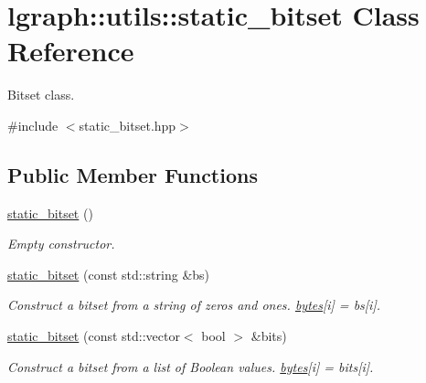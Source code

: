 \hypertarget{classlgraph_1_1utils_1_1static__bitset}{}\section{lgraph\+:\+:utils\+:\+:static\+\_\+bitset Class Reference}
\label{classlgraph_1_1utils_1_1static__bitset}


Bitset class.  




{\ttfamily \#include $<$static\+\_\+bitset.\+hpp$>$}

\subsection*{Public Member Functions}
\begin{DoxyCompactItemize}
\item 
\mbox{\label{classlgraph_1_1utils_1_1static__bitset_a6bd7edf22c70684b97eed197bb8fcda5}} 
\hyperlink{classlgraph_1_1utils_1_1static__bitset_a6bd7edf22c70684b97eed197bb8fcda5}{static\+\_\+bitset} ()
\begin{DoxyCompactList}\small\item\em Empty constructor. \end{DoxyCompactList}\item 
\mbox{\label{classlgraph_1_1utils_1_1static__bitset_ad8aaa938472eb7fcdc3ac1b3270600f6}} 
\hyperlink{classlgraph_1_1utils_1_1static__bitset_ad8aaa938472eb7fcdc3ac1b3270600f6}{static\+\_\+bitset} (const std\+::string \&bs)
\begin{DoxyCompactList}\small\item\em Construct a bitset from a string of zeros and ones. \hyperlink{classlgraph_1_1utils_1_1static__bitset_a56d277fc22bbf71a27fca530a133c9bd}{bytes}\mbox{[}i\mbox{]} = {\itshape bs}\mbox{[}i\mbox{]}. \end{DoxyCompactList}\item 
\mbox{\label{classlgraph_1_1utils_1_1static__bitset_a98921bd3c2ef416c5270045c63eb84a1}} 
\hyperlink{classlgraph_1_1utils_1_1static__bitset_a98921bd3c2ef416c5270045c63eb84a1}{static\+\_\+bitset} (const std\+::vector$<$ bool $>$ \&bits)
\begin{DoxyCompactList}\small\item\em Construct a bitset from a list of Boolean values. \hyperlink{classlgraph_1_1utils_1_1static__bitset_a56d277fc22bbf71a27fca530a133c9bd}{bytes}\mbox{[}i\mbox{]} = {\itshape bits}\mbox{[}i\mbox{]}. \end{DoxyCompactList}\item 

\end{DoxyCompactItemize}
